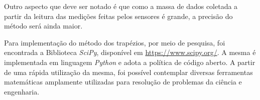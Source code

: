 Outro aspecto que deve ser notado é que como a massa de dados coletada a partir da leitura das medições feitas pelos sensores é grande, a
precisão do método será ainda maior.

Para implementação do método dos trapézios, por meio de pesquisa, foi encontrada a Biblioteca \textit{SciPy}, disponível em \href{https://www.scipy.org/}{https://www.scipy.org/}. A mesma é implementada em linguagem \textit{Python} e adota a política de código aberto. A partir de uma rápida utilização da mesma, foi possível contemplar diversas ferramentas matemáticas amplamente utilizadas para resolução de problemas da ciência e engenharia.
